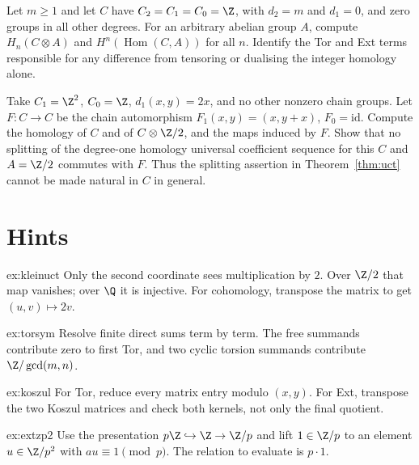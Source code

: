 \begin{exercise}[$\star\star$]\label{ex:v10new-ch07-coefficients}
Let $m\ge1$ and let $C$ have $C_2=C_1=C_0=\Z$, with $d_2=m$ and $d_1=0$, and zero groups in all other degrees. For an arbitrary abelian group $A$, compute $H_n(C\otimes A)$ and $H^n(\operatorname{Hom}(C,A))$ for all $n$. Identify the Tor and Ext terms responsible for any difference from tensoring or dualising the integer homology alone.
\end{exercise}

\begin{exercise}[$\star\star\star$]\label{ex:v10new-ch07-splitting}
Take $C_1=\Z^2$, $C_0=\Z$, $d_1(x,y)=2x$, and no other nonzero chain groups. Let $F:C\to C$ be the chain automorphism
$F_1(x,y)=(x,y+x)$, $F_0=\mathrm{id}$. Compute the homology of $C$ and of $C\otimes\Z/2$, and the maps induced by $F$. Show that no splitting of the degree-one homology universal coefficient sequence for this $C$ and $A=\Z/2$ commutes with $F$. Thus the splitting assertion in Theorem~\ref{thm:uct} cannot be made natural in $C$ in general.
\end{exercise}

\section{Hints}

\begin{hint}{ex:kleinuct}
Only the second coordinate sees multiplication by $2$. Over $\Z/2$ that map vanishes; over $\Q$ it is injective. For cohomology, transpose the matrix to get $(u,v)\mapsto2v$.
\end{hint}

\begin{hint}{ex:torsym}
Resolve finite direct sums term by term. The free summands contribute zero to first Tor, and two cyclic torsion summands contribute $\Z/\gcd(m,n)$.
\end{hint}

\begin{hint}{ex:koszul}
For Tor, reduce every matrix entry modulo $(x,y)$. For Ext, transpose the two Koszul matrices and check both kernels, not only the final quotient.
\end{hint}

\begin{hint}{ex:extzp2}
Use the presentation $p\Z\hookrightarrow\Z\to\Z/p$ and lift $1\in\Z/p$ to an element $u\in\Z/p^2$ with $au\equiv1\pmod p$. The relation to evaluate is $p\cdot1$.
\end{hint}

